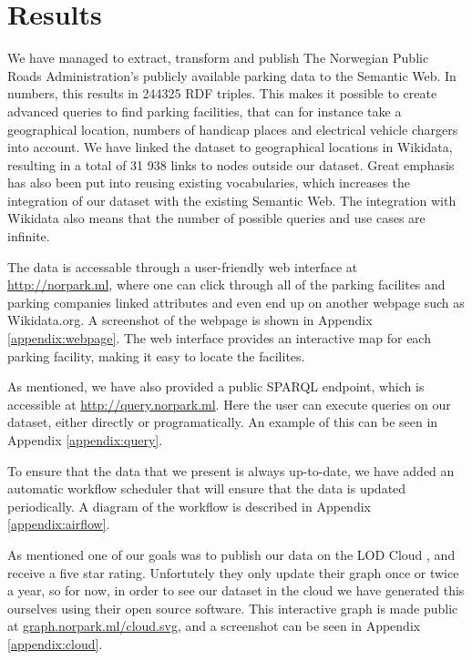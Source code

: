 \chapter{Results}
We have managed to extract, transform and publish The Norwegian Public Roads Administration's publicly available parking data to the Semantic Web. In numbers, this results in 244325 RDF triples. This makes it possible to create advanced queries to find parking facilities, that can for instance take a geographical location, numbers of handicap places and electrical vehicle chargers into account. We have linked the dataset to geographical locations in Wikidata, resulting in a total of 31 938 links to nodes outside our dataset. Great emphasis has also been put into reusing existing vocabularies, which increases the integration of our dataset with the existing Semantic Web. The integration with Wikidata also means that the number of possible queries and use cases are infinite.

\vspace{5mm}
The data is accessable through a user-friendly web interface at \url{http://norpark.ml}, where one can click through all of the parking facilites and parking companies linked attributes and even end up on another webpage such as Wikidata.org. A screenshot of the webpage is shown in Appendix \ref{appendix:webpage}. The web interface provides an interactive map for each parking facility, making it easy to locate the facilites.

\vspace{5mm}

As mentioned, we have also provided a public SPARQL endpoint, which is accessible at \url{http://query.norpark.ml}. Here the user can execute queries on our dataset, either directly or programatically. An example of this can be seen in Appendix \ref{appendix:query}.

\vspace{5mm}

To ensure that the data that we present is always up-to-date, we have added an automatic workflow scheduler that will ensure that the data is updated periodically. A diagram of the workflow is described in Appendix \ref{appendix:airflow}.

\vspace{5mm}

As mentioned one of our goals was to publish our data on the LOD Cloud \cite{lod-cloud}, and receive a five star rating. Unfortutely they only update their graph once or twice a year, so for now, in order to see our dataset in the cloud we have generated this ourselves using their open source software. This interactive graph is made public at \url{graph.norpark.ml/cloud.svg}, and a screenshot can be seen in Appendix \ref{appendix:cloud}.


